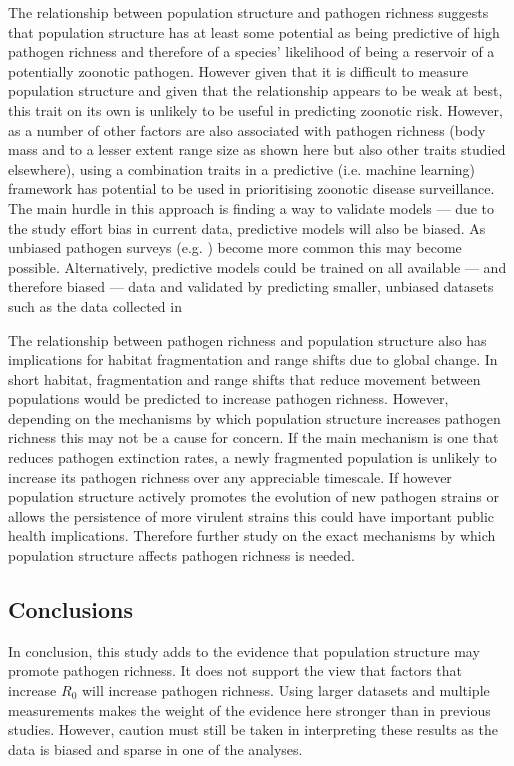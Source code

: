 The relationship between population structure and pathogen richness suggests that population structure has at least some potential as being predictive of high pathogen richness and therefore of a species' likelihood of being a reservoir of a potentially zoonotic pathogen. 
However given that it is difficult to measure population structure and given that the relationship appears to be weak at best, this trait on its own is unlikely to be useful in predicting zoonotic risk.
However, as a number of other factors are also associated with pathogen richness (body mass and to a lesser extent range size as shown here but also other traits studied elsewhere), using a combination traits in a predictive (i.e. machine learning) framework has potential to be used in prioritising zoonotic disease surveillance.
The main hurdle in this approach is finding a way to validate models --- due to the study effort bias in current data, predictive models will also be biased.
As unbiased pathogen surveys (e.g. \textcite{anthony2013strategy}) become more common this may become possible.
Alternatively, predictive models could be trained on all available --- and therefore biased --- data and validated by predicting smaller, unbiased datasets such as the data collected in \textcite{maganga2014bat}

The relationship between pathogen richness and population structure also has implications for habitat fragmentation and range shifts due to global change.
In short habitat, fragmentation and range shifts that reduce movement between populations would be predicted to increase pathogen richness.
However, depending on the mechanisms by which population structure increases pathogen richness this may not be a cause for concern.
If the main mechanism is one that reduces pathogen extinction rates, a newly fragmented population is unlikely to increase its pathogen richness over any appreciable timescale.
If however population structure actively promotes the evolution of new pathogen strains or allows the persistence of more virulent strains \cite{blackwood2013resolving, pons2014insights, plowright2011urban} this could have important public health implications.
Therefore further study on the exact mechanisms by which population structure affects pathogen richness is needed. 

\subsection{Conclusions}

In conclusion, this study adds to the evidence that population structure may promote pathogen richness.
It does not support the view that factors that increase $R_0$ will increase pathogen richness.
Using larger datasets and multiple measurements makes the weight of the evidence here stronger than in previous studies.
However, caution must still be taken in interpreting these results as the data is biased and sparse in one of the analyses.





